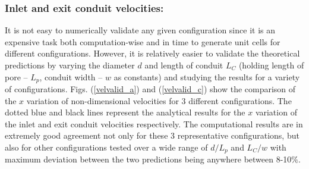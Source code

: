 \documentclass[twocolumn,10pt,cleanfoot]{ihmtc}
\begin{document}
\subsubsection*{Inlet and exit conduit velocities:} It is not easy to numerically validate any given configuration since it is an expensive task both computation-wise and in time to generate unit cells for different configurations. However, it is relatively easier to validate the theoretical predictions by varying the diameter $d$ and length of conduit $L_C$ (holding length of pore -- $L_p$, conduit width -- $w$ as constants) and studying the results for a variety of configurations. Figs. (\ref{velvalid_a}) and (\ref{velvalid_c}) show the comparison of the $x$ variation of non-dimensional velocities for 3 different configurations. The dotted blue and black lines represent the analytical results for the $ x $ variation of the inlet and exit conduit velocities respectively. The computational results are in extremely good agreement not only for these 3 representative configurations, but also for other configurations tested over a wide range of $d/L_p$ and $L_C/w$ with maximum deviation between the two predictions being anywhere between 8-10$\%$.
%
\end{document}
